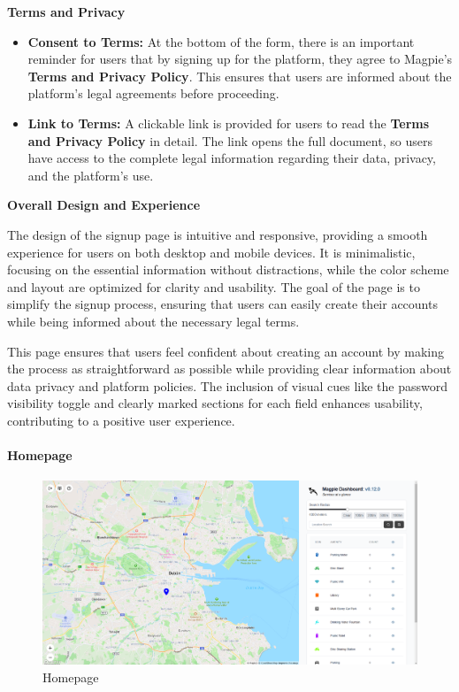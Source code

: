 \textbf{Terms and Privacy}

\begin{itemize}
    \item{} \textbf{Consent to Terms:} At the bottom of the form, there is an important reminder for users that by signing up for the platform, they agree to Magpie's \textbf{Terms and Privacy Policy}. This ensures that users are informed about the platform’s legal agreements before proceeding. 
    \item{} \textbf{Link to Terms:} A clickable link is provided for users to read the \textbf{Terms and Privacy Policy} in detail. The link opens the full document, so users have access to the complete legal information regarding their data, privacy, and the platform's use.
\end{itemize}

\textbf{Overall Design and Experience}

The design of the signup page is intuitive and responsive, providing a smooth experience for users on both desktop and mobile devices. It is minimalistic, focusing on the essential information without distractions, while the color scheme and layout are optimized for clarity and usability. The goal of the page is to simplify the signup process, ensuring that users can easily create their accounts while being informed about the necessary legal terms.

This page ensures that users feel confident about creating an account by making the process as straightforward as possible while providing clear information about data privacy and platform policies. The inclusion of visual cues like the password visibility toggle and clearly marked sections for each field enhances usability, contributing to a positive user experience.



\newpage{}

\paragraph{Homepage}\mbox{}

\begin{figure}[h]
    \centering{}
    \includegraphics[width=1\textwidth]{images/site/home/homepage_1.png}
    \caption{Homepage}
\end{figure}




